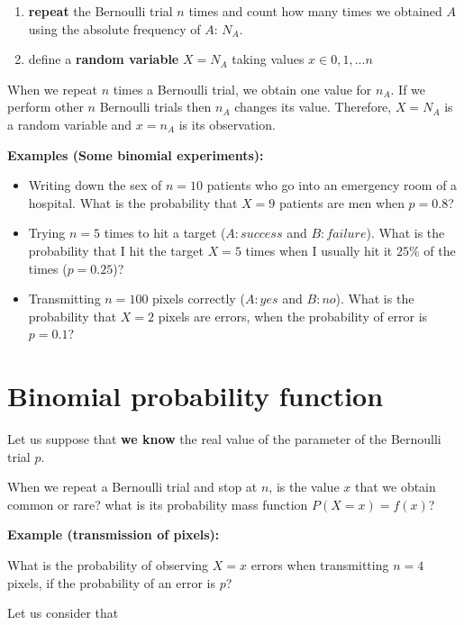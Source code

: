 \documentclass[
]{book}
\begin{document}
\begin{enumerate}
\def\labelenumi{\arabic{enumi})}
\item
  \textbf{repeat} the Bernoulli trial \(n\) times and count how many times we obtained \(A\) using the absolute frequency of \(A\): \(N_A\).
\item
  define a \textbf{random variable} \(X=N_A\) taking values \(x \in {0,1,...n}\)
\end{enumerate}

When we repeat \(n\) times a Bernoulli trial, we obtain one value for \(n_A\). If we perform other \(n\) Bernoulli trials then \(n_A\) changes its value. Therefore, \(X=N_A\) is a random variable and \(x=n_A\) is its observation.

\textbf{Examples (Some binomial experiments):}

\begin{itemize}
\item
  Writing down the sex of \(n=10\) patients who go into an emergency room of a hospital. What is the probability that \(X=9\) patients are men when \(p=0.8\)?
\item
  Trying \(n=5\) times to hit a target (\(A:success\) and \(B:failure\)). What is the probability that I hit the target \(X=5\) times when I usually hit it \(25\%\) of the times (\(p=0.25\))?
\item
  Transmitting \(n=100\) pixels correctly (\(A:yes\) and \(B:no\)). What is the probability that \(X=2\) pixels are errors, when the probability of error is \(p=0.1\)?
\end{itemize}

\hypertarget{binomial-probability-function}{%
\section{Binomial probability function}\label{binomial-probability-function}}

Let us suppose that \textbf{we know} the real value of the parameter of the Bernoulli trial \(p\).

When we repeat a Bernoulli trial and stop at \(n\), is the value \(x\) that we obtain common or rare? what is its probability mass function \(P(X=x)=f(x)\)?

\textbf{Example (transmission of pixels):}

What is the probability of observing \(X=x\) errors when transmitting \(n=4\) pixels, if the probability of an error is \(p\)?

Let us consider that
\end{document}
